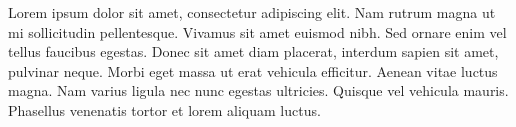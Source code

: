 Lorem ipsum dolor sit amet, consectetur adipiscing elit. Nam rutrum magna ut mi sollicitudin pellentesque. Vivamus sit amet euismod nibh. Sed ornare enim vel tellus faucibus egestas. Donec sit amet diam placerat, interdum sapien sit amet, pulvinar neque. Morbi eget massa ut erat vehicula efficitur. Aenean vitae luctus magna. Nam varius ligula nec nunc egestas ultricies. Quisque vel vehicula mauris. Phasellus venenatis tortor et lorem aliquam luctus.
